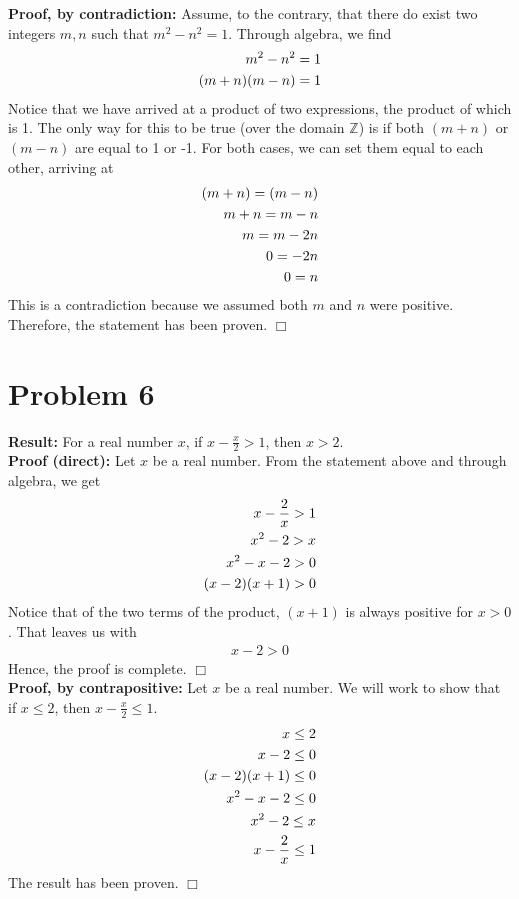 \documentclass[11pt]{article}
\begin{document}
    \textbf{Proof, by contradiction:} Assume, to the contrary, that there do exist two integers $m, n$ such that $m^2 - n^2 = 1$. Through algebra, we find 
    \begin{align}
        m^2 - n^2 &= 1 \notag \\
        (m + n)(m - n) &= 1 \notag
    \end{align}
    Notice that we have arrived at a product of two expressions, the product of which is 1. The only way for this to be true (over the domain $\mathbb{Z}$) is if both $(m + n)$ or $(m - n)$ are equal to 1 or -1. For both cases, we can set them equal to each other, arriving at
    \begin{align}
        (m + n) = (m - n) \notag \\
        m + n = m - n \notag \\
        m = m - 2n \notag \\
        0 = -2n \notag \\
        0 = n \notag
    \end{align}
    This is a contradiction because we assumed both $m$ and $n$ were positive. Therefore, the statement has been proven. \hfill $\Box$

\newpage


\section*{Problem 6}

    \textbf{Result:} For a real number $x$, if $ x - \frac{x}{2} > 1$, then $x > 2$. \\
    
    \textbf{Proof (direct):} Let $x$ be a real number. From the statement above and through algebra, we get 
    \begin{align}
        x - \frac{2}{x} > 1 \notag \\
        x^2 - 2 > x \notag \\
        x^2 -x -2 > 0 \notag \\
        (x - 2)(x + 1) > 0 \notag 
    \end{align} 
    Notice that of the two terms of the product, $(x+1)$ is always positive for $x > 0$. That leaves us with
    \begin{align}
        x - 2 > 0
    \end{align}
    Hence, the proof is complete. \hfill $\Box$ \\

    \textbf{Proof, by contrapositive:} Let $x$ be a real number. We will work to show that if $x \leq 2$, then $ x - \frac{x}{2} \leq 1$.
    \begin{align}
        x \leq 2 \notag \\
        x - 2 \leq 0 \notag \\
        (x-2)(x+1) \leq 0 \notag \\
        x^2 - x - 2 \leq 0 \notag \\
        x^2 - 2 \leq x \notag \\
        x - \frac{2}{x} \leq 1 \notag
    \end{align}
    The result has been proven. \hfill $\Box$ \\
\end{document}

